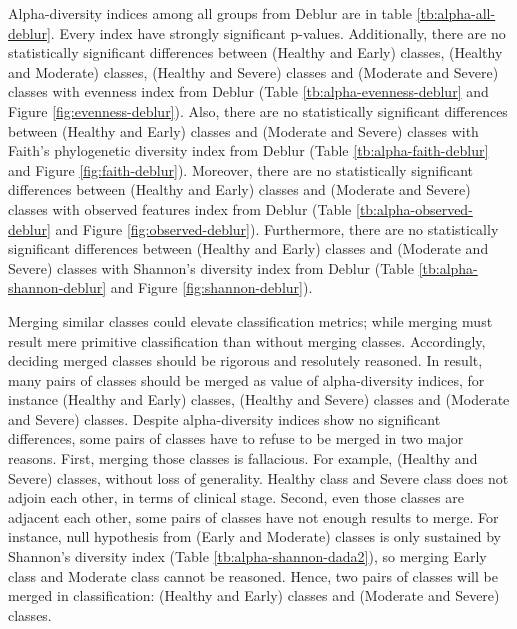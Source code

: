 \documentclass[a4paper]{article}
\begin{document}
{            Alpha-diversity indices among all groups from Deblur are in table \ref{tb:alpha-all-deblur}. Every index have strongly significant p-values. Additionally, there are no statistically significant differences between (Healthy and Early) classes, (Healthy and Moderate) classes, (Healthy and Severe) classes and (Moderate and Severe) classes with evenness index from Deblur (Table \ref{tb:alpha-evenness-deblur} and Figure \ref{fig:evenness-deblur}). Also, there are no statistically significant differences between (Healthy and Early) classes and (Moderate and Severe) classes with Faith's phylogenetic diversity index from Deblur (Table \ref{tb:alpha-faith-deblur} and Figure \ref{fig:faith-deblur}). Moreover, there are no statistically significant differences between (Healthy and Early) classes and (Moderate and Severe) classes with observed features index from Deblur (Table \ref{tb:alpha-observed-deblur} and Figure \ref{fig:observed-deblur}). Furthermore, there are no statistically significant differences between (Healthy and Early) classes and (Moderate and Severe) classes with Shannon's diversity index from Deblur (Table \ref{tb:alpha-shannon-deblur} and Figure \ref{fig:shannon-deblur}).

            Merging similar classes could elevate classification metrics; while merging must result mere primitive classification than without merging classes. Accordingly, deciding merged classes should be rigorous and resolutely reasoned. In result, many pairs of classes should be merged as value of alpha-diversity indices, for instance (Healthy and Early) classes, (Healthy and Severe) classes and (Moderate and Severe) classes. Despite alpha-diversity indices show no significant differences, some pairs of classes have to refuse to be merged in two major reasons. First, merging those classes is fallacious. For example, (Healthy and Severe) classes, without loss of generality. Healthy class and Severe class does not adjoin each other, in terms of clinical stage. Second, even those classes are adjacent each other, some pairs of classes have not enough results to merge. For instance, null hypothesis from (Early and Moderate) classes is only sustained by Shannon's diversity index (Table \ref{tb:alpha-shannon-dada2}), so merging Early class and Moderate class cannot be reasoned. Hence, two pairs of classes will be merged in classification: (Healthy and Early) classes and (Moderate and Severe) classes.

}
\end{document}
